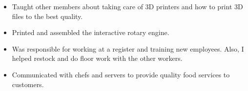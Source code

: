\documentclass[10pt,a4paper]{altacv}
\begin{document}


\begin{itemize}
  \item Taught other members about taking care of 3D printers and how to print 3D files to the best quality. 
  \item Printed and assembled the interactive rotary engine.
  
\end{itemize}

%













\begin{itemize}
	\item Was responsible for working at a register and training new employees. Also, I helped restock and do floor work with the other workers. 
\end{itemize}
\smallskip
%


\begin{itemize}
	\item Communicated with chefs and servers to provide quality food services to customers.
\end{itemize}
%
\end{document}

